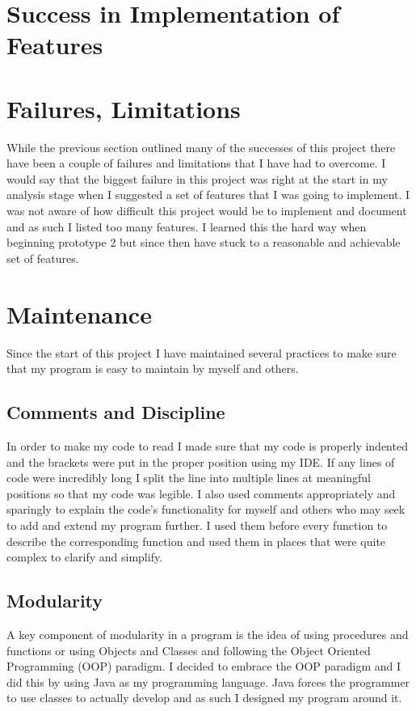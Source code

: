 \documentclass[../../../main.tex]{subfiles}
\begin{document}
\newpage
\section{Success in Implementation of Features}


\newpage
\section{Failures, Limitations}
While the previous section outlined many of the successes of this project there have been a couple of failures and limitations that I have had to overcome.
I would say that the biggest failure in this project was right at the start in my analysis stage when I suggested a set of features that I was going to implement. I was not aware of how difficult this project would be to implement and document and as such I listed too many features. I learned this the hard way when beginning prototype 2 but since then have stuck to a reasonable and achievable set of features.


\section{Maintenance}%
Since the start of this project I have maintained several practices to make sure that my program is easy to maintain by myself and others.
\subsection{Comments and Discipline}
In order to make my code to read I made sure that my code is properly indented and the brackets were put in the proper position using my IDE. If any lines of code were incredibly long I split the line into multiple lines at meaningful positions so that my code was legible. I also used comments appropriately and sparingly to explain the code's functionality for myself and others who may seek to add and extend my program further. I used them before every function to describe the corresponding function and used them in places that were quite complex to clarify and simplify.

\subsection{Modularity}
A key component of modularity in a program is the idea of using procedures and functions or using Objects and Classes and following the Object Oriented Programming (OOP) paradigm. I decided to embrace the OOP paradigm and I did this by using Java as my programming language. Java forces the programmer to use classes to actually develop and as such I designed my program around it.
\end{document}
